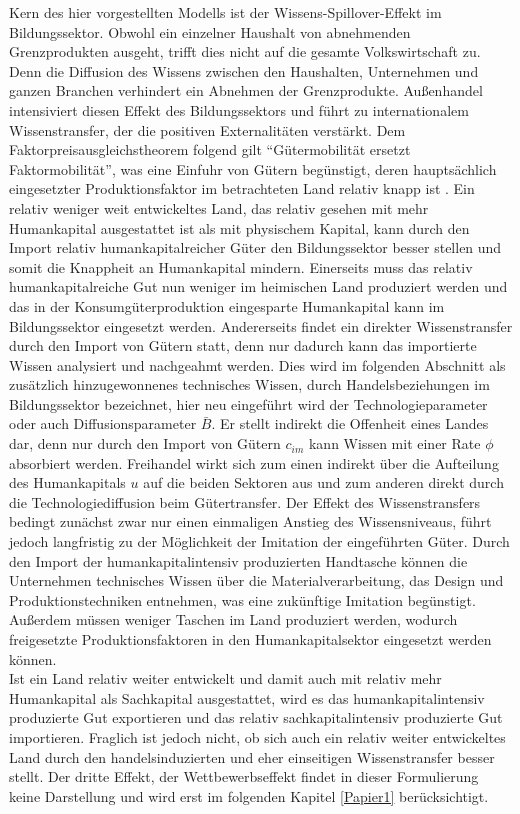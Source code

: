 Kern des hier vorgestellten Modells ist der Wissens-Spillover-Effekt im Bildungssektor. Obwohl ein einzelner Haushalt von abnehmenden Grenzprodukten ausgeht, trifft dies nicht auf die gesamte Volkswirtschaft zu. Denn die Diffusion des Wissens zwischen den Haushalten, Unternehmen und ganzen Branchen verhindert ein Abnehmen der Grenzprodukte. Au{\ss}enhandel intensiviert diesen Effekt des Bildungssektors und führt zu internationalem Wissenstransfer, der die positiven Externalitäten verstärkt. Dem Faktorpreisausgleichstheorem folgend gilt "`Gütermobilität ersetzt Faktormobilität"', was  eine Einfuhr von Gütern begünstigt, deren hauptsächlich eingesetzter Produktionsfaktor im betrachteten Land relativ knapp ist \citep{Samuelson.1941}. Ein relativ weniger weit entwickeltes Land, das relativ gesehen mit mehr Humankapital ausgestattet ist als mit physischem Kapital, kann durch den Import relativ humankapitalreicher Güter den Bildungssektor besser stellen und somit die Knappheit an Humankapital mindern. Einerseits muss das relativ humankapitalreiche Gut nun weniger im heimischen Land produziert werden und das in der Konsumgüterproduktion eingesparte Humankapital kann im Bildungssektor eingesetzt werden. Andererseits findet ein direkter Wissenstransfer durch den Import von Gütern statt, denn nur dadurch kann das importierte Wissen analysiert und nachgeahmt werden. Dies wird im folgenden Abschnitt als zusätzlich hinzugewonnenes technisches Wissen, durch Handelsbeziehungen im Bildungssektor bezeichnet, hier neu eingeführt wird der Technologieparameter oder auch Diffusionsparameter $\bar{B}$. Er stellt indirekt die Offenheit eines Landes dar, denn nur durch den Import von Gütern $c_{im}$ kann Wissen mit einer Rate $\phi$ absorbiert werden. Freihandel wirkt sich zum einen indirekt über die Aufteilung des Humankapitals $u$ auf die beiden Sektoren aus und zum anderen direkt durch die Technologiediffusion beim Gütertransfer. Der Effekt des Wissenstransfers bedingt zunächst zwar nur einen einmaligen Anstieg des Wissensniveaus, führt jedoch langfristig zu der Möglichkeit der Imitation der eingeführten Güter. Durch den Import der humankapitalintensiv produzierten Handtasche können die Unternehmen technisches Wissen über die Materialverarbeitung, das Design und Produktionstechniken entnehmen, was eine zukünftige Imitation begünstigt. Au{\ss}erdem müssen weniger Taschen im Land produziert werden, wodurch freigesetzte Produktionsfaktoren in den Humankapitalsektor eingesetzt werden können.\\
Ist ein Land relativ weiter entwickelt und damit auch mit relativ mehr Humankapital als Sachkapital ausgestattet, wird es das humankapitalintensiv produzierte Gut exportieren und das relativ sachkapitalintensiv produzierte Gut importieren. Fraglich ist jedoch nicht, ob sich auch ein relativ weiter entwickeltes Land durch den handelsinduzierten und eher einseitigen Wissenstransfer besser stellt. 
Der dritte Effekt, der Wettbewerbseffekt findet in dieser Formulierung keine Darstellung und wird erst im folgenden Kapitel \ref{Papier1} berücksichtigt. 

